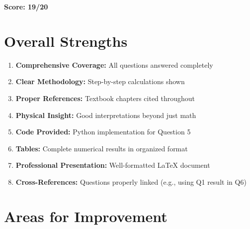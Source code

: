 \documentclass[11pt,letterpaper]{article}
\begin{document}
\textbf{Score: 19/20}

\section{Overall Strengths}

\begin{enumerate}
    \item \textbf{Comprehensive Coverage:} All questions answered completely
    \item \textbf{Clear Methodology:} Step-by-step calculations shown
    \item \textbf{Proper References:} Textbook chapters cited throughout
    \item \textbf{Physical Insight:} Good interpretations beyond just math
    \item \textbf{Code Provided:} Python implementation for Question 5
    \item \textbf{Tables:} Complete numerical results in organized format
    \item \textbf{Professional Presentation:} Well-formatted LaTeX document
    \item \textbf{Cross-References:} Questions properly linked (e.g., using Q1 result in Q6)
\end{enumerate}

\section{Areas for Improvement}
\end{document}
